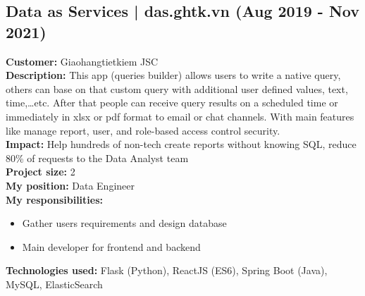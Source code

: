\documentclass[11pt,a4paper,roman]{moderncv}
\begin{document}
    \subsection{Data as Services | das.ghtk.vn (Aug 2019 - Nov 2021)}
    \textbf{Customer:} Giaohangtietkiem JSC \\
    \textbf{Description:} This app (queries builder) allows users to write a native query, others can base on that custom query with additional user defined values, text, time,\ldots etc. After that people can receive query results on a scheduled time or immediately in xlsx or pdf format to email or chat channels. With main features like manage report, user, and role-based access control security. \\
    \textbf{Impact:} Help hundreds of non-tech create reports without knowing SQL, reduce 80\% of requests to the Data Analyst team \\
    \textbf{Project size:} 2 \\
    \textbf{My position:} Data Engineer \\
    \textbf{My responsibilities:}
    \begin{itemize}
        \item Gather users requirements and design database
        \item Main developer for frontend and backend
    \end{itemize}
    \textbf{Technologies used:} Flask (Python), ReactJS (ES6), Spring Boot (Java), MySQL, ElasticSearch
\end{document}
